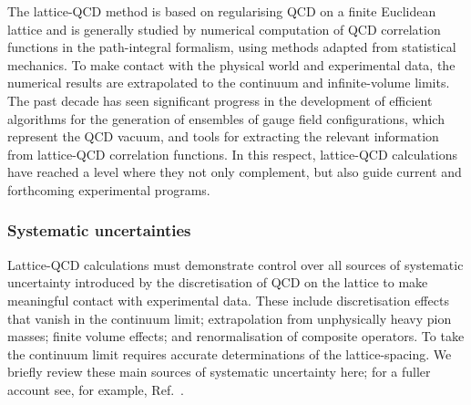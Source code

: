 The lattice-QCD method is based on
regularising QCD on a finite Euclidean lattice and is generally
studied by numerical computation of QCD correlation functions in the
path-integral formalism, using methods adapted from statistical
mechanics.
%
To make contact with the physical world and experimental
data, the numerical results are extrapolated to the continuum 
and infinite-volume limits.
%
The past decade has seen significant progress in
the development of efficient algorithms for the generation of
ensembles of gauge field configurations, which represent the QCD
vacuum, and tools for extracting the relevant information from lattice-QCD
correlation functions.
%
In this respect, lattice-QCD calculations have reached a level where
they not only complement, but also guide current and forthcoming
experimental programs.

\subsubsection{Systematic uncertainties}
Lattice-QCD calculations must demonstrate control over all sources of
systematic uncertainty introduced by the discretisation of QCD on the
lattice to make meaningful contact with experimental data.
%
These
include discretisation effects that vanish in the continuum limit;
extrapolation from unphysically heavy pion masses; finite volume
effects; and renormalisation of composite operators.
%
To take the 
continuum limit requires accurate determinations of the lattice-spacing. 
We briefly review these main sources of systematic
uncertainty here; for a fuller account see, for
example, Ref.~\cite{Aoki:2016frl}.

